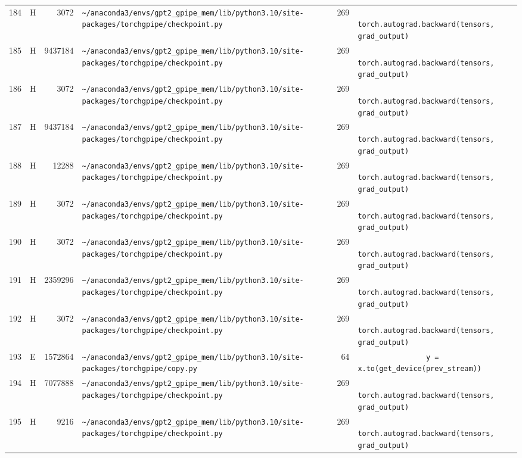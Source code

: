 \documentclass{article}
\begin{document}
\begin{longtable}{r l r p{6.5cm} r p{7.0cm}}
184 & H & 3072 & \lstinline|~/anaconda3/envs/gpt2_gpipe_mem/lib/python3.10/site-packages/torchgpipe/checkpoint.py| & 269 & \lstinline|            torch.autograd.backward(tensors, grad_output)| \\
185 & H & 9437184 & \lstinline|~/anaconda3/envs/gpt2_gpipe_mem/lib/python3.10/site-packages/torchgpipe/checkpoint.py| & 269 & \lstinline|            torch.autograd.backward(tensors, grad_output)| \\
186 & H & 3072 & \lstinline|~/anaconda3/envs/gpt2_gpipe_mem/lib/python3.10/site-packages/torchgpipe/checkpoint.py| & 269 & \lstinline|            torch.autograd.backward(tensors, grad_output)| \\
187 & H & 9437184 & \lstinline|~/anaconda3/envs/gpt2_gpipe_mem/lib/python3.10/site-packages/torchgpipe/checkpoint.py| & 269 & \lstinline|            torch.autograd.backward(tensors, grad_output)| \\
188 & H & 12288 & \lstinline|~/anaconda3/envs/gpt2_gpipe_mem/lib/python3.10/site-packages/torchgpipe/checkpoint.py| & 269 & \lstinline|            torch.autograd.backward(tensors, grad_output)| \\
189 & H & 3072 & \lstinline|~/anaconda3/envs/gpt2_gpipe_mem/lib/python3.10/site-packages/torchgpipe/checkpoint.py| & 269 & \lstinline|            torch.autograd.backward(tensors, grad_output)| \\
190 & H & 3072 & \lstinline|~/anaconda3/envs/gpt2_gpipe_mem/lib/python3.10/site-packages/torchgpipe/checkpoint.py| & 269 & \lstinline|            torch.autograd.backward(tensors, grad_output)| \\
191 & H & 2359296 & \lstinline|~/anaconda3/envs/gpt2_gpipe_mem/lib/python3.10/site-packages/torchgpipe/checkpoint.py| & 269 & \lstinline|            torch.autograd.backward(tensors, grad_output)| \\
192 & H & 3072 & \lstinline|~/anaconda3/envs/gpt2_gpipe_mem/lib/python3.10/site-packages/torchgpipe/checkpoint.py| & 269 & \lstinline|            torch.autograd.backward(tensors, grad_output)| \\
193 & E & 1572864 & \lstinline|~/anaconda3/envs/gpt2_gpipe_mem/lib/python3.10/site-packages/torchgpipe/copy.py| & 64 & \lstinline|                y = x.to(get_device(prev_stream))| \\
194 & H & 7077888 & \lstinline|~/anaconda3/envs/gpt2_gpipe_mem/lib/python3.10/site-packages/torchgpipe/checkpoint.py| & 269 & \lstinline|            torch.autograd.backward(tensors, grad_output)| \\
195 & H & 9216 & \lstinline|~/anaconda3/envs/gpt2_gpipe_mem/lib/python3.10/site-packages/torchgpipe/checkpoint.py| & 269 & \lstinline|            torch.autograd.backward(tensors, grad_output)| \\

\end{longtable}
\end{document}
